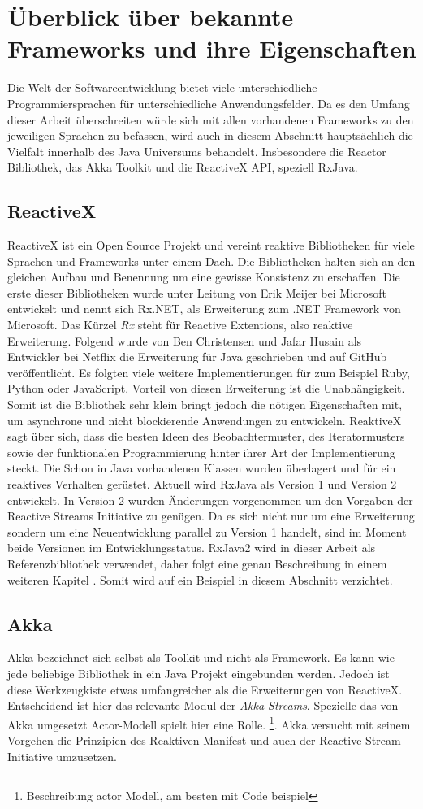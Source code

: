 \section{Überblick über bekannte Frameworks und ihre Eigenschaften}
Die Welt der Softwareentwicklung bietet viele unterschiedliche Programmiersprachen für unterschiedliche Anwendungsfelder. Da es den Umfang dieser Arbeit überschreiten würde sich mit allen vorhandenen Frameworks zu den jeweiligen Sprachen zu befassen, wird auch in diesem Abschnitt hauptsächlich die Vielfalt innerhalb des Java Universums behandelt. Insbesondere die Reactor Bibliothek, das Akka Toolkit und die ReactiveX API, speziell RxJava.
\subsection{ReactiveX}
ReactiveX ist ein Open Source Projekt und vereint reaktive Bibliotheken für viele Sprachen und Frameworks unter einem Dach. Die Bibliotheken halten sich an den gleichen Aufbau und Benennung um eine gewisse Konsistenz zu erschaffen. Die erste dieser Bibliotheken wurde unter Leitung von Erik Meijer bei Microsoft entwickelt und nennt sich Rx.NET, als Erweiterung zum .NET Framework von Microsoft. Das Kürzel \textit{Rx} steht für Reactive Extentions, also reaktive Erweiterung. Folgend wurde von Ben Christensen und Jafar Husain als Entwickler bei Netflix die Erweiterung für Java geschrieben und auf GitHub veröffentlicht. Es folgten viele weitere Implementierungen für zum Beispiel Ruby, Python oder JavaScript. Vorteil von diesen Erweiterung ist die Unabhängigkeit. Somit ist die Bibliothek sehr klein bringt jedoch die nötigen Eigenschaften mit, um asynchrone und nicht blockierende Anwendungen zu entwickeln. ReaktiveX sagt über sich, dass die besten Ideen des Beobachtermuster, des Iteratormusters sowie der funktionalen Programmierung hinter ihrer Art der Implementierung steckt. Die Schon in Java vorhandenen Klassen wurden überlagert und für ein reaktives Verhalten gerüstet. Aktuell wird RxJava als Version 1 und Version 2 entwickelt. In Version 2 wurden Änderungen vorgenommen um den Vorgaben der Reactive Streams Initiative zu genügen. Da es sich nicht nur um eine Erweiterung sondern um eine Neuentwicklung parallel zu Version 1 handelt, sind im Moment beide Versionen im Entwicklungsstatus. RxJava2 wird in dieser Arbeit als Referenzbibliothek verwendet, daher folgt eine genau Beschreibung in einem weiteren Kapitel \cite{rxgit}. Somit wird auf ein Beispiel in diesem Abschnitt verzichtet.
\subsection{Akka}
Akka bezeichnet sich selbst als Toolkit und nicht als Framework. Es kann wie jede beliebige Bibliothek in ein Java Projekt eingebunden werden. Jedoch ist diese Werkzeugkiste etwas umfangreicher als die Erweiterungen von ReactiveX. Entscheidend ist hier das relevante Modul der \textit{Akka Streams}. Spezielle das von Akka umgesetzt Actor-Modell spielt hier eine Rolle. \footnote{Beschreibung actor Modell, am besten mit Code beispiel}. Akka versucht mit seinem Vorgehen die Prinzipien des Reaktiven Manifest und auch der Reactive Stream Initiative umzusetzen.
